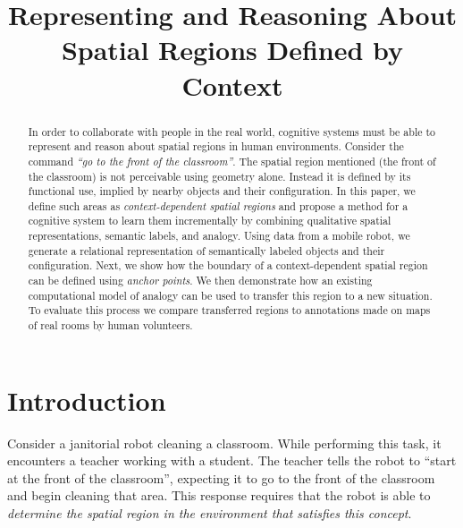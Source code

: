 \documentclass[letterpaper]{article}
\begin{document}
\title{Representing and Reasoning About Spatial Regions Defined by Context}

\author{}


\maketitle
\begin{abstract}
In order to collaborate with people in the real world, cognitive systems must be able to represent and reason about spatial regions in human environments. Consider the command \emph{``go to the front of the classroom''}. The spatial region mentioned (the front of the classroom) is not perceivable using geometry alone. Instead it is defined by its functional use, implied by nearby objects and their configuration. In this paper, we define such areas as \textit{context-dependent spatial regions} and propose a method for a cognitive system to learn them incrementally by combining qualitative spatial representations, semantic labels, and analogy. Using data from a mobile robot, we generate a relational representation of semantically labeled objects and their configuration. Next, we show how the boundary of a context-dependent spatial region can be defined using \textit{anchor points}. We then demonstrate how an existing computational model of analogy can be used to transfer this region to a new situation. To evaluate this process we compare transferred regions to annotations made on maps of real rooms by human volunteers.
\end{abstract}

 \section{Introduction}

Consider a janitorial robot cleaning a classroom. While performing this task, it encounters a teacher working with a student. The teacher tells the robot to ``start at the front of the classroom'', expecting it to go to the front of the classroom and begin cleaning that area. This response requires that the robot is able to \emph{determine the spatial region in the environment that satisfies this concept}.
\end{document}
